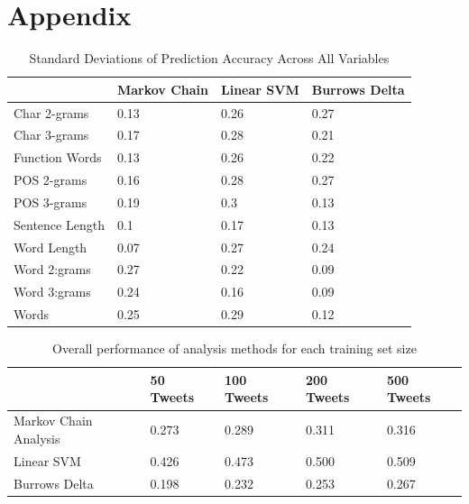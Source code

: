 \documentclass[pageno]{jpaper}
\begin{document}
\section{Appendix}
\begin{table}[h]
\centering
\begin{tabular}{|l|l|l|l|}
\hline
                & Markov Chain & Linear SVM & Burrows Delta \\ \hline
Char 2-grams    & 0.13         & 0.26       & 0.27          \\ \hline
Char 3-grams    & 0.17         & 0.28       & 0.21          \\ \hline
Function Words  & 0.13         & 0.26       & 0.22          \\ \hline
POS 2-grams     & 0.16         & 0.28       & 0.27          \\ \hline
POS 3-grams     & 0.19         & 0.3        & 0.13          \\ \hline
Sentence Length & 0.1          & 0.17       & 0.13          \\ \hline
Word Length     & 0.07         & 0.27       & 0.24          \\ \hline
Word 2:grams    & 0.27         & 0.22       & 0.09          \\ \hline
Word 3:grams    & 0.24         & 0.16       & 0.09          \\ \hline
Words           & 0.25         & 0.29       & 0.12          \\ \hline
\end{tabular}
\caption{Standard Deviations of Prediction Accuracy Across All Variables}
\label{generalStdDev}
\end{table}

\begin{table}[h!]
\centering
\begin{tabular}{|l|l|l|l|l|}
\hline
                      & 50 Tweets   & 100 Tweets   & 200 Tweets  & 500 Tweets \\ \hline
Markov Chain Analysis & 0.273 & 0.289 & 0.311 & 0.316 \\ \hline
Linear SVM            & 0.426 & 0.473 & 0.500 & 0.509 \\ \hline
Burrows Delta         & 0.198 & 0.232 & 0.253 & 0.267 \\ \hline
\end{tabular}
\caption{Overall performance of analysis methods for each training set size}
\label{OverallChangeTraining}
\end{table}
\end{document}
